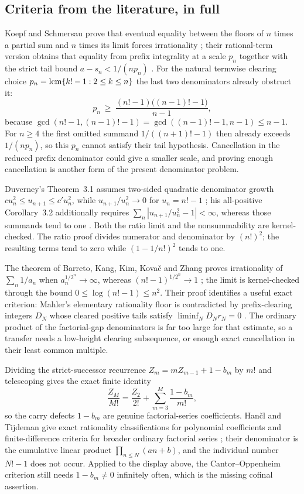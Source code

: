 \documentclass[11pt]{article}
\begin{document}
\subsection{Criteria from the literature, in full}\label{long68:sec:ext-literature}

Koepf and Schmersau prove that eventual equality between the floors of $n$
times a partial sum and $n$ times its limit forces irrationality
\cite[Thm.~1.1, p.~117]{koepf-schmersau}; their rational-term version obtains
that equality from prefix integrality at a scale $p_n$ together with the
strict tail bound $a-s_n<1/(np_n)$
\cite[Thms.~2.2--2.3, pp.~119--120]{koepf-schmersau}.  For the natural
termwise clearing choice $p_n=\operatorname{lcm}\{k!-1:2\le k\le n\}$ the last two
denominators already obstruct it:
\[
 p_n\ \ge\ \frac{(n!-1)\bigl((n-1)!-1\bigr)}{n-1},
\]
because $\gcd(n!-1,(n-1)!-1)=\gcd((n-1)!-1,n-1)\le n-1$.  For $n\ge4$ the
first omitted summand $1/((n+1)!-1)$ then already exceeds $1/(np_n)$, so this
$p_n$ cannot satisfy their tail hypothesis.  Cancellation in the reduced
prefix denominator could give a smaller scale, and proving enough
cancellation is another form of the present denominator problem.

Duverney's Theorem~3.1 assumes two-sided quadratic denominator growth
$cu_n^2\le u_{n+1}\le c'u_n^2$, while $u_{n+1}/u_n^2\to0$ for $u_n=n!-1$
\cite[pp.~275, 285--286]{duverney}; his all-positive Corollary~3.2
additionally requires $\sum_n|u_{n+1}/u_n^2-1|<\infty$, whereas those
summands tend to one \cite[Cor.~3.2, p.~287]{duverney}.  Both the ratio limit
and the nonsummability are kernel-checked.  The ratio proof divides numerator
and denominator by $(n!)^2$; the resulting terms tend to zero while
$(1-1/n!)^2$ tends to one.

The theorem of Barreto, Kang, Kim, Kova\v{c} and Zhang proves irrationality
of $\sum_n1/a_n$ when $a_n^{1/2^n}\to\infty$, whereas $(n!-1)^{1/2^n}\to1$
\cite[Thms.~2--3, pp.~2--4]{barreto-et-al}; the limit is kernel-checked
through the bound $0\le\log(n!-1)\le n^2$.  Their proof identifies a useful
exact criterion: Mahler's elementary rationality floor is contradicted by
prefix-clearing integers $D_N$ whose cleared positive tails satisfy
$\liminf_ND_Nr_N=0$ \cite[Lem.~8 and Prop.~12, pp.~6, 9--12]{barreto-et-al}.
The ordinary product of the factorial-gap denominators is far too large for
that estimate, so a transfer needs a low-height clearing subsequence, or
enough exact cancellation in their least common multiple.

Dividing the strict-successor recurrence $Z_m=mZ_{m-1}+1-b_m$ by $m!$ and
telescoping gives the exact finite identity
\[
 \frac{Z_M}{M!}=\frac{Z_2}{2!}+\sum_{m=3}^{M}\frac{1-b_m}{m!},
\]
so the carry defects $1-b_m$ are genuine factorial-series coefficients.
Han\v{c}l and Tijdeman give exact rationality classifications for polynomial
coefficients and finite-difference criteria for broader ordinary factorial
series \cite[Thm.~3.1 and Cor.~3.1, pp.~390--391]{hancl-tijdeman}; their
denominator is the cumulative linear product $\prod_{n\le N}(an+b)$, and the
individual number $N!-1$ does not occur.  Applied to the display above, the Cantor--Oppenheim criterion
still needs $1-b_m\ne0$ infinitely often, which is the missing cofinal
assertion.
\end{document}
